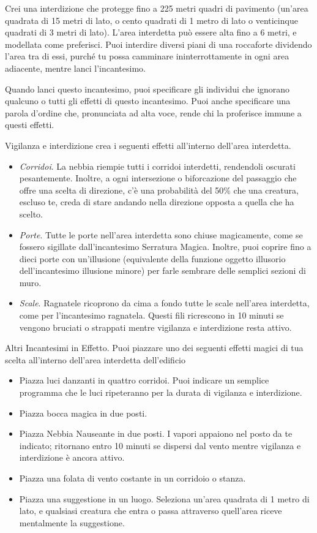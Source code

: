 \begin{multicols}{2}
Crei una interdizione che protegge fino a 225 metri quadri di pavimento (un'area quadrata di 15 metri di lato, o cento quadrati di 1 metro di lato o venticinque quadrati di 3 metri di lato). L'area interdetta può essere alta fino a 6 metri, e modellata come preferisci. Puoi interdire diversi piani di una roccaforte dividendo l'area tra di essi, purché tu possa camminare ininterrottamente in ogni area adiacente, mentre lanci l'incantesimo.

Quando lanci questo incantesimo, puoi specificare gli individui che ignorano qualcuno o tutti gli effetti di questo incantesimo. Puoi anche specificare una parola d'ordine che, pronunciata ad alta voce, rende chi la proferisce immune a questi effetti.

Vigilanza e interdizione crea i seguenti effetti all'interno dell'area interdetta.

\begin{itemize}[leftmargin=*] \setlength{\itemsep}{0pt}

	\item \emph{Corridoi}. La nebbia riempie tutti i corridoi interdetti, rendendoli oscurati pesantemente. Inoltre, a ogni intersezione o biforcazione del passaggio che offre una scelta di direzione, c'è una probabilità del 50\% che una creatura, escluso te, creda di stare andando nella direzione opposta a quella che ha scelto.
	\item \emph{Porte}. Tutte le porte nell'area interdetta sono chiuse magicamente, come se fossero sigillate dall'incantesimo Serratura Magica. Inoltre, puoi coprire fino a dieci porte con un'illusione (equivalente della funzione oggetto illusorio dell'incantesimo illusione minore) per farle sembrare delle semplici sezioni di muro.
	\item \emph{Scale}. Ragnatele ricoprono da cima a fondo tutte le scale nell'area interdetta, come per l'incantesimo ragnatela. Questi fili ricrescono in 10 minuti se vengono bruciati o strappati mentre vigilanza e interdizione resta attivo.
\end{itemize}

Altri Incantesimi in Effetto. Puoi piazzare uno dei seguenti effetti magici di tua scelta all'interno dell'area interdetta dell'edificio

\begin{itemize}[leftmargin=*] \setlength{\itemsep}{0pt}
	\item Piazza luci danzanti in quattro corridoi. Puoi indicare un semplice programma che le luci ripeteranno per la durata di vigilanza e interdizione.
	\item Piazza bocca magica in due posti.
	\item Piazza Nebbia Nauseante in due posti. I vapori appaiono nel posto da te indicato; ritornano entro 10 minuti se dispersi dal vento mentre vigilanza e interdizione è ancora attivo.
	\item Piazza una folata di vento costante in un corridoio o stanza.
	\item Piazza una suggestione in un luogo. Seleziona un'area quadrata di 1 metro di lato, e qualsiasi creatura che entra o passa attraverso quell'area riceve mentalmente la suggestione.
\end{itemize}


\end{multicols}
